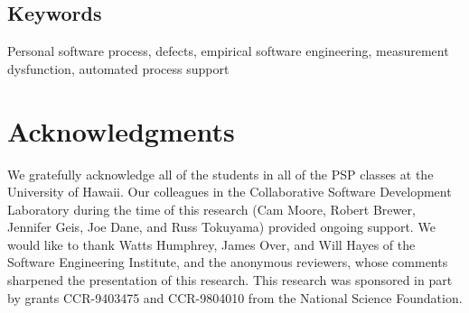 \subsection*{Keywords}

\noindent Personal software process, defects, 
empirical software engineering,
measurement dysfunction, automated process support\\

\newpage
\tableofcontents
\newpage



 
 

    

\section{Acknowledgments}

We gratefully acknowledge all of the students in all of the PSP classes at
the University of Hawaii.  Our colleagues in the Collaborative Software
Development Laboratory during the time of this research (Cam Moore, Robert
Brewer, Jennifer Geis, Joe Dane, and Russ Tokuyama) provided ongoing
support.  We would like to thank Watts Humphrey, James Over, and Will Hayes
of the Software Engineering Institute, and the anonymous reviewers, whose
comments sharpened the presentation of this research.  This research was
sponsored in part by grants CCR-9403475 and CCR-9804010 from the National
Science Foundation.



 





